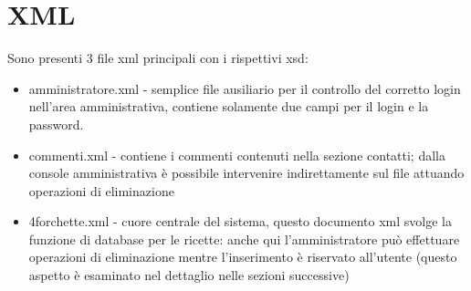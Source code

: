\documentclass[12pt]{article}
\begin{document}
		\newpage	
	
				
		\section{XML}
		Sono presenti 3 file xml principali con i rispettivi xsd:

		\begin{itemize}
		\item  amministratore.xml - semplice file ausiliario per il controllo del corretto login nell'area amministrativa, contiene solamente due campi per il login e la password.
		
		\item commenti.xml - contiene i commenti contenuti nella sezione contatti; dalla console amministrativa è possibile intervenire indirettamente sul file attuando operazioni di eliminazione
		
		\item 4forchette.xml - cuore centrale del sistema, questo documento xml svolge la funzione di database per le ricette: anche qui l'amministratore può effettuare operazioni di eliminazione mentre l'inserimento è riservato all'utente (questo aspetto \`e esaminato nel dettaglio nelle sezioni successive)
		\end{itemize}				
					
\end{document}
